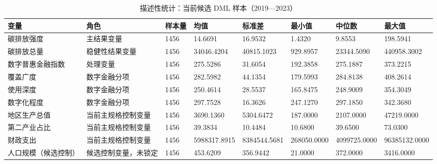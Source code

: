 \begin{table}
\caption{描述性统计：当前候选 DML 样本（2019—2023）}
\label{tab:descriptive_statistics}
\begin{tabular}{llllllll}
\toprule
变量 & 角色 & 样本量 & 均值 & 标准差 & 最小值 & 中位数 & 最大值 \\
\midrule
碳排放强度 & 主结果变量 & 1456 & 14.6691 & 16.9532 & 1.4320 & 9.8553 & 198.5941 \\
碳排放总量 & 稳健性结果变量 & 1456 & 34046.4204 & 40815.1023 & 929.8957 & 23344.5090 & 440958.3002 \\
数字普惠金融指数 & 处理变量 & 1456 & 275.5286 & 31.6054 & 192.3858 & 275.1887 & 373.2215 \\
覆盖广度 & 数字金融分项 & 1456 & 282.5982 & 44.1354 & 179.5993 & 284.8138 & 408.2614 \\
使用深度 & 数字金融分项 & 1456 & 250.4614 & 28.5537 & 165.8475 & 248.9009 & 354.3049 \\
数字化程度 & 数字金融分项 & 1456 & 297.7528 & 16.3626 & 247.1270 & 297.1850 & 342.3680 \\
地区生产总值 & 当前主规格控制变量 & 1456 & 3690.1360 & 5304.6472 & 187.0000 & 2107.0000 & 47219.0000 \\
第二产业占比 & 当前主规格控制变量 & 1456 & 39.3834 & 10.4484 & 10.6800 & 39.6500 & 73.0300 \\
财政支出 & 当前主规格控制变量 & 1456 & 5988317.8915 & 8384544.5681 & 268050.0000 & 4099725.0000 & 96385132.0000 \\
人口规模（候选控制） & 候选控制变量，未锁定 & 1456 & 453.6209 & 356.9442 & 21.0000 & 372.0000 & 3416.0000 \\
\bottomrule
\end{tabular}
\end{table}
